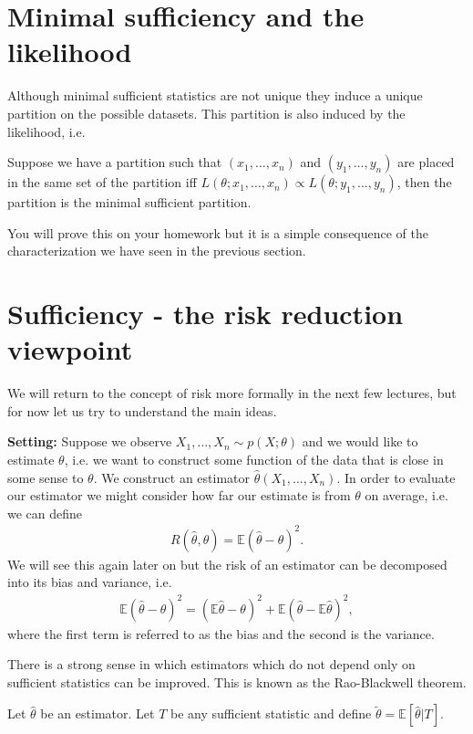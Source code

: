 \documentclass[twoside,12pt]{article}
\begin{document}
\section{Minimal sufficiency and the likelihood}
Although minimal sufficient statistics are not unique they induce a unique partition on the possible datasets. This partition is also induced by the likelihood, i.e.

Suppose we have a partition such that $(x_1,\ldots,x_n)$ and $(y_1,\ldots,y_n)$ are placed in the same set of the partition iff $L(\theta;  x_1,\ldots,x_n) \propto L(\theta; y_1,\ldots,y_n)$, then the partition is the minimal sufficient partition. 

You will prove this on your homework but it is a simple consequence of the characterization we have seen in the previous section.

\section{Sufficiency - the risk reduction viewpoint}
We will return to the concept of risk more formally in the next few lectures, but for now let us try to understand the main ideas. 

{\bf Setting: } Suppose we observe $X_1,\ldots,X_n \sim p(X; \theta)$ and we would like to estimate $\theta$, i.e. we want to construct some function of the data that is close in some sense to $\theta$. We construct an estimator $\widehat{\theta}(X_1,\ldots,X_n)$. In order to evaluate our estimator we might consider how far our estimate is from $\theta$ on average, i.e. we can define
\begin{align*}
R(\widehat{\theta},\theta) = \mathbb{E} (\widehat{\theta} - \theta)^2.
\end{align*}
We will see this again later on but the risk of an estimator can be decomposed into its bias and variance, i.e.
\begin{align*}
\mathbb{E} (\widehat{\theta} - \theta)^2 = (\mathbb{E}\widehat{\theta} - \theta)^2 + \mathbb{E}(\widehat{\theta} - \mathbb{E}\widehat{\theta})^2, 
\end{align*}
where the first term is referred to as the bias and the second is the variance.

There is a strong sense in which estimators which do not depend only on sufficient statistics can be improved. This is known as the Rao-Blackwell theorem.

Let $\widehat{\theta}$ be an estimator. Let $T$ be any sufficient statistic and define $\widetilde{\theta} = \mathbb{E}[\widehat{\theta} | T].$
\end{document}
